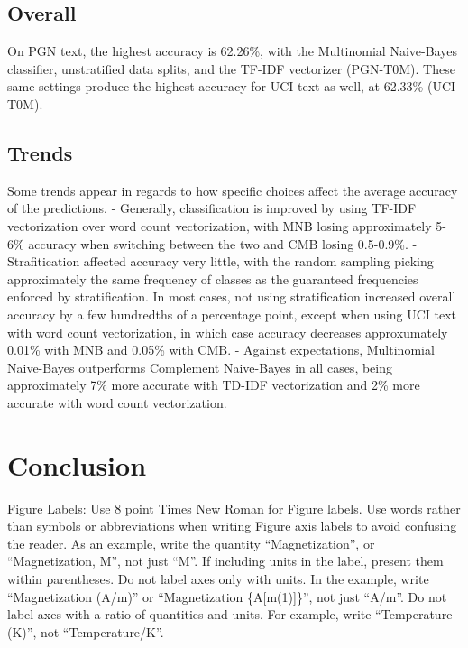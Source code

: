 \documentclass[conference]{IEEEtran}
\begin{document}
\subsection{Overall}

On PGN text, the highest accuracy is 62.26\%, with the Multinomial Naive-Bayes classifier, unstratified data splits, and the TF-IDF vectorizer (PGN-T0M). These same settings produce the highest accuracy for UCI text as well, at 62.33\% (UCI-T0M).

\subsection{Trends}

Some trends appear in regards to how specific choices affect the average accuracy of the predictions.
- Generally, classification is improved by using TF-IDF vectorization over word count vectorization, with MNB losing approximately 5-6\% accuracy when switching between the two and CMB losing 0.5-0.9\%.
- Strafitication affected accuracy very little, with the random sampling picking approximately the same frequency of classes as the guaranteed frequencies enforced by stratification. In most cases, not using stratification increased overall accuracy by a few hundredths of a percentage point, except when using UCI text with word count vectorization, in which case accuracy decreases approxumately 0.01\% with MNB and 0.05\% with CMB.
- Against expectations, Multinomial Naive-Bayes outperforms Complement Naive-Bayes in all cases, being approximately 7\% more accurate with TD-IDF vectorization and 2\% more accurate with word count vectorization.

\section{Conclusion}

Figure Labels: Use 8 point Times New Roman for Figure labels. Use words 
rather than symbols or abbreviations when writing Figure axis labels to 
avoid confusing the reader. As an example, write the quantity 
``Magnetization'', or ``Magnetization, M'', not just ``M''. If including 
units in the label, present them within parentheses. Do not label axes only 
with units. In the example, write ``Magnetization (A/m)'' or ``Magnetization 
\{A[m(1)]\}'', not just ``A/m''. Do not label axes with a ratio of 
quantities and units. For example, write ``Temperature (K)'', not 
``Temperature/K''.
\end{document}
